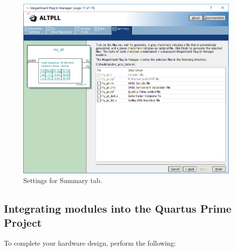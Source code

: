 \documentclass[11pt, twoside, pdftex]{article}
\begin{document}
\begin{enumerate}
\begin{figure}[H]
	\centering
	  \includegraphics[scale=0.65]{figures/mega_pll_settings_4.png}
	\caption{Settings for Summary tab.} 
	\label{fig:mega_pll_settings_4}
\end{figure}

\end{enumerate}


\subsection{Integrating modules into the Quartus\textsuperscript{\textregistered} Prime Project}
To complete your hardware design, perform the following:
\end{document}
